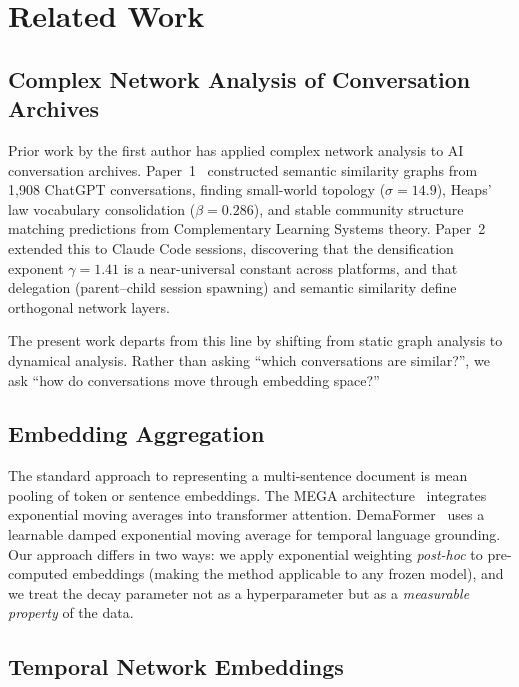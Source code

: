 \documentclass[11pt]{article}
\begin{document}
\section{Related Work}

\subsection{Complex Network Analysis of Conversation Archives}

Prior work by the first author has applied complex network analysis to AI conversation archives. Paper~1~\citep{towell2025cognitive} constructed semantic similarity graphs from 1,908 ChatGPT conversations, finding small-world topology ($\sigma = 14.9$), Heaps' law vocabulary consolidation ($\beta = 0.286$), and stable community structure matching predictions from Complementary Learning Systems theory. Paper~2~\citep{towell2026episodes} extended this to Claude Code sessions, discovering that the densification exponent $\gamma = 1.41$ is a near-universal constant across platforms, and that delegation (parent--child session spawning) and semantic similarity define orthogonal network layers.

The present work departs from this line by shifting from static graph analysis to dynamical analysis. Rather than asking ``which conversations are similar?'', we ask ``how do conversations move through embedding space?''

\subsection{Embedding Aggregation}

The standard approach to representing a multi-sentence document is mean pooling of token or sentence embeddings. The MEGA architecture~\citep{ma2023mega} integrates exponential moving averages into transformer attention. DemaFormer~\citep{nguyen2023demaformer} uses a learnable damped exponential moving average for temporal language grounding. Our approach differs in two ways: we apply exponential weighting \emph{post-hoc} to pre-computed embeddings (making the method applicable to any frozen model), and we treat the decay parameter not as a hyperparameter but as a \emph{measurable property} of the data.

\subsection{Temporal Network Embeddings}
\end{document}
